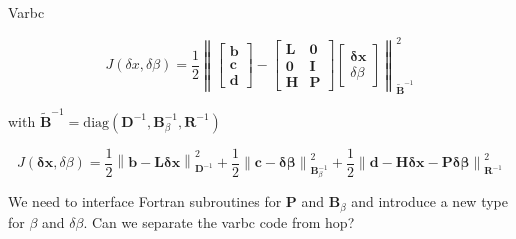 \documentclass[9pt]{beamer}
\newcommand{\op}[1]{\mathrm{\mathbf{#1}}}
\renewcommand{\vec}[1]{\mathrm{\mathbf{#1}}}
\begin{document}
\begin{frame}[fragile]{Varbc}

  \begin{equation*} J(\delta x, \delta \beta) = \frac{1}{2}\left\| \begin{bmatrix} \vec{b} \\ \vec{c}  \\ \vec{d} \end{bmatrix} -  \begin{bmatrix} 
  \op{L} &  \op{0} \\ \op{0} &  \op{I} \\ 
\op{H} & \op{P} 
\end{bmatrix} 
\begin{bmatrix}
  \vec{\delta x} \\  \delta \beta
\end{bmatrix} \right\|^2_{{\tilde{\op{B}}}^{-1}}
\end{equation*}

with
$\tilde{\op{B}}^{-1} = \mathrm{diag}(\op{D}^{-1}, \op{B}^{-1}_{\beta},\op{R}^{-1}) $ 

\pause 

\begin{equation*} J(\vec{\delta x}, \delta \beta) = \frac{1}{2}\left\|\vec{b} - \op{L}\vec{\delta x}\right\|^2_{\op{D}^{-1}} + \frac{1}{2}\left\| \vec{c} - \vec{\delta \beta} \right\|^2_{\op{B}^{-1}_{\beta}}  
  +  \frac{1}{2}\left\| \vec{d}   - \op{H}\vec{\delta x} - \op{P}\vec{\delta \beta} \right\|^2_{\op{R}^{-1}}
\end{equation*}


We need to interface Fortran subroutines for $\op{P}$  and $\op{B}_{\beta}$ and introduce a new type for $\beta$ and $\delta \beta$. 
Can we separate the varbc code from hop?  



\end{frame}




\end{document}
